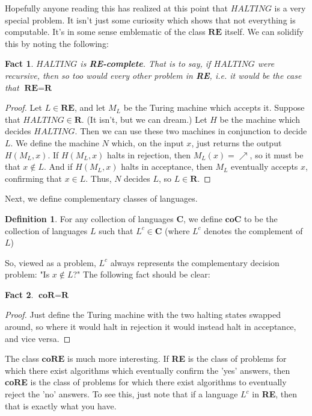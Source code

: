 \documentclass{article}
\theoremstyle{definition}
\newtheorem{definition}{Definition}[section]
\theoremstyle{plain}
\theoremstyle{theorem}
\newtheorem{fact}{Fact}[section]
\begin{document}
\par Hopefully anyone reading this has realized at this point that $HALTING$ is a very special problem. It isn't just some curiosity which shows that not everything is computable. It's in some sense emblematic of the class $\textbf{RE}$ itself. We can solidify this by noting the following:
\begin{fact}
    $HALTING$ is \textbf{RE-complete}. That is to say, if $HALTING$ were recursive, then so too would every other problem in \textbf{RE}, i.e. it would be the case that $\textbf{RE} = \textbf{R}$
\end{fact}
\begin{proof}
    Let $L \in \textbf{RE}$, and let $M_L$ be the Turing machine which accepts it. Suppose that $HALTING \in \textbf{R}$. (It isn't, but we can dream.) Let $H$ be the machine which decides $HALTING$. Then we can use these two machines in conjunction to decide $L$. We define the machine $N$ which, on the input $x$, just returns the output $H(M_L,x)$. If $H(M_L,x)$ halts in rejection, then $M_L(x)=\nearrow$, so it must be that $x \notin L$. And if $H(M_L,x)$ halts in acceptance, then $M_L$ eventually accepts $x$, confirming that $x \in L$. Thus, $N$ decides $L$, so $L \in \textbf{R}$. 
\end{proof}
\par Next, we define complementary classes of languages.
\begin{definition}
    For any collection of languages $\textbf{C}$, we define $\textbf{coC}$ to be the collection of languages $L$ such that $L^c \in \textbf{C}$ (where $L^c$ denotes the complement of $L$)
\end{definition}
So, viewed as a problem, $L^c$ always represents the complementary decision problem: "Is $x \notin L$?" The following fact should be clear:
\begin{fact}
    $\textbf{coR} = \textbf{R}$
\end{fact}
\begin{proof}
    Just define the Turing machine with the two halting states swapped around, so where it would halt in rejection it would instead halt in acceptance, and vice versa.
\end{proof}
The class $\textbf{coRE}$ is much more interesting. If \textbf{RE} is the class of problems for which there exist algorithms which eventually confirm the 'yes' answers, then \textbf{coRE} is the class of problems for which there exist algorithms to eventually reject the 'no' answers. To see this, just note that if a language $L^c$ in \textbf{RE}, then that is exactly what you have.
\end{document}
